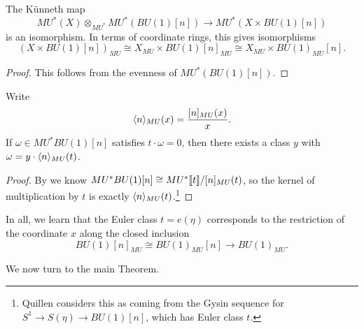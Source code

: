 \begin{corollary}
The K\"unneth map \[MU^*(X) \otimes_{MU^*} MU^*(BU(1)[n]) \to MU^*(X \times BU(1)[n])\] is an isomorphism.  In terms of coordinate rings, this gives isomorphisms \[(X \times BU(1)[n])_{MU} \cong X_{MU} \times BU(1)[n]_{MU} \cong X_{MU} \times BU(1)_{MU}[n].\]
\end{corollary}
\begin{proof}
This follows from the evenness of $MU^*(BU(1)[n])$.
\end{proof}

\begin{corollary}\label{QuillensGysinFact}
Write \[\langle n\rangle_{MU}(x) = \frac{[n]_{MU}(x)}{x}.\]  If $\omega \in MU^* BU(1)[n]$ satisfies $t \cdot \omega = 0$, then there exists a class $y$ with $\omega = y \cdot \langle n\rangle_{MU}(t)$.
\end{corollary}
\begin{proof}
By  we know $MU^* BU(1)[n] \cong MU^*\llbracket{t}\rrbracket / [n]_{MU}(t)$, so the kernel of multiplication by $t$ is exactly $\langle n\rangle_{MU}(t)$.\footnote{Quillen considers this as coming from the Gysin sequence for $S^1 \to S(\eta) \to BU(1)[n]$, which has Euler class $t$.}
\end{proof}

\noindent In all, we learn that the Euler class $t = e(\eta)$ corresponds to the restriction of the coordinate $x$ along the closed inclusion \[BU(1)[n]_{MU} \cong BU(1)_{MU}[n] \to BU(1)_{MU}.\]

We now turn to the main Theorem.

